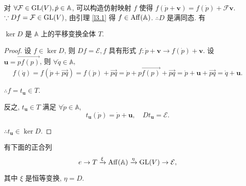 \documentclass[color=black,device=normal,lang=cn,mode=geye]{elegantnote}
\begin{document}
对 $\forall\mathcal{F}\in\operatorname{GL} (V),\dot{p}\in\mathbb{A}$, 可以构造仿射映射 $f$ 使得 $f(\dot{p}+\boldsymbol{v})=f(\dot{p})+\mathcal{F}\boldsymbol{v}$. $\because Df=\mathcal{F}\in\operatorname{GL} (V)$, 由引理 \ref{l3.1} 得 $f\in\operatorname{Aff} (\mathbb{A})$. $\therefore D$ 是满同态. 有
\begin{lemma}
    $\ker D$ 是 $\mathbb{A}$ 上的平移变换全体 $T$.
\end{lemma}
\begin{proof}
    设 $f\in\ker D$, 则 $Df=\mathcal{E},f$ 具有形式 $f:\dot{p}+\boldsymbol{v}\to f(\dot{p})+\boldsymbol{v}$. 设 $\boldsymbol{u}=\overrightarrow{pf(p)}$, 则 $\forall\dot{q}\in\mathbb{A}$,
    \[f(\dot{q})=f(\dot{p}+\overrightarrow{pq})=f(\dot{p})+\overrightarrow{pq}=\dot{p}+\overrightarrow{pf(p)}+\overrightarrow{pq}=\dot{p}+\boldsymbol{u}+\overrightarrow{pq}=\dot{q}+\boldsymbol{u}.\]

    $\therefore f=t_{\boldsymbol{u}}\in T$.

    反之, $t_{\boldsymbol{u}}\in T$ 满足 $\forall\dot{p}\in\mathbb{A}$,
    \[t_{\boldsymbol{u}}(\dot{p})=\dot{p}+\boldsymbol{u},\quad Dt_{\boldsymbol{u}}=\mathcal{E}.\]

    $\therefore t_{\boldsymbol{u}}\in\ker D$.
\end{proof}
有下面的正合列
\begin{equation}\label{eq3.1}
    e\to T\xrightarrow{\xi}\operatorname{Aff} (\mathbb{A})\xrightarrow{\eta}\operatorname{GL} (V)\to\mathcal{E},
\end{equation}

其中 $\xi$ 是恒等变换, $\eta=D$.
\end{document}
